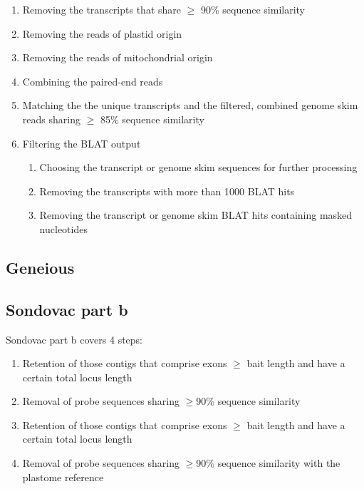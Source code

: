 \begin{enumerate}
\item Removing the transcripts that share $\geq$ 90\% sequence similarity

\item Removing the reads of plastid origin

\item Removing the reads of mitochondrial origin

\item Combining the paired-end reads

\item Matching the the unique transcripts and the filtered, combined genome skim reads sharing $\geq$ 85\% sequence similarity

\item Filtering the BLAT output
\begin{enumerate}
\item Choosing the transcript or genome skim sequences for further processing
\item Removing the transcripts with more than 1000 BLAT hits
\item Removing the transcript or genome skim BLAT hits containing masked nucleotides
\end{enumerate}
\end{enumerate}


\subsection{Geneious}

\subsection{Sondovac part b}
Sondovac part b covers 4 steps:
  
\begin{enumerate}
\item Retention of those contigs that comprise exons $\geq$ bait length and have a certain total locus length
\item Removal of probe sequences sharing $\geq$90\% sequence similarity
\item Retention of those contigs that comprise exons $\geq$ bait length and have a certain total locus length
\item Removal of probe sequences sharing $\geq$90\% sequence similarity with the plastome reference
\end{enumerate}

